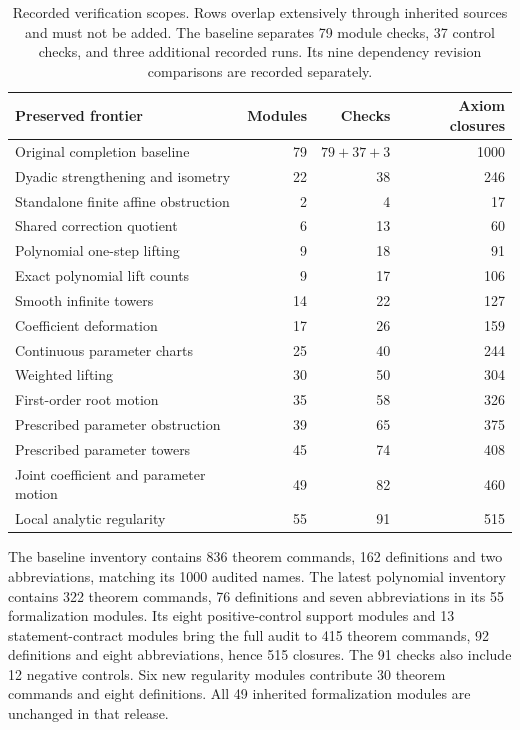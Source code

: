 \begin{table}[htbp]
\centering
\small
\begin{tabular}{@{}lrrr@{}}
\toprule
Preserved frontier & Modules & Checks & Axiom closures\\
\midrule
Original completion baseline & 79 & $79+37+3$ & 1000\\
Dyadic strengthening and isometry & 22 & 38 & 246\\
Standalone finite affine obstruction & 2 & 4 & 17\\
Shared correction quotient & 6 & 13 & 60\\
Polynomial one-step lifting & 9 & 18 & 91\\
Exact polynomial lift counts & 9 & 17 & 106\\
Smooth infinite towers & 14 & 22 & 127\\
Coefficient deformation & 17 & 26 & 159\\
Continuous parameter charts & 25 & 40 & 244\\
Weighted lifting & 30 & 50 & 304\\
First-order root motion & 35 & 58 & 326\\
Prescribed parameter obstruction & 39 & 65 & 375\\
Prescribed parameter towers & 45 & 74 & 408\\
Joint coefficient and parameter motion & 49 & 82 & 460\\
Local analytic regularity & 55 & 91 & 515\\
\bottomrule
\end{tabular}
\caption{Recorded verification scopes. Rows overlap extensively through
inherited sources and must not be added. The baseline separates 79 module
checks, 37 control checks, and three additional recorded runs. Its nine
dependency revision comparisons are recorded separately.}
\label{tab:verification-frontiers}
\end{table}

The baseline inventory contains 836 theorem commands, 162 definitions and two
abbreviations, matching its 1000 audited names. The latest polynomial inventory
contains 322 theorem commands, 76 definitions and seven abbreviations in its
55 formalization modules. Its eight positive-control support modules and
13 statement-contract modules bring the full audit to 415 theorem commands,
92 definitions and eight abbreviations, hence 515 closures. The 91 checks also
include 12 negative controls. Six new regularity modules contribute 30 theorem
commands and eight definitions. All 49 inherited formalization modules are
unchanged in that release.

